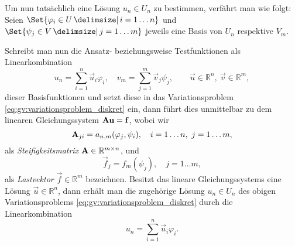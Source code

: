 Um nun tatsächlich eine Lösung $u_{n} \in U_{n}$ zu bestimmen, verfährt man wie folgt:
Seien $\Set{ \varphi_{i} \in U \given i = 1 \dots n }$ und $\Set{ \psi_{j} \in V \given j = 1 \dots m}$ jeweils eine Basis von $U_{n}$ respektive $V_{m}$.

Schreibt man nun die Ansatz- beziehungsweise Testfunktionen als Linearkombination
\begin{equation}
    u_{n} = \sum_{i = 1}^{n} \vec{u}_{i} \varphi_{i}, \quad v_{m} = \sum_{j = 1}^{m} \vec{v}_{j} \psi_{j}, \qquad \vec u \in \mathbb{R}^{n},~\vec v \in \mathbb{R}^{m},
\end{equation}
dieser Basisfunktionen und setzt diese in das Variationsproblem \eqref{eq:gv:variationsproblem_diskret} ein, dann führt dies unmittelbar zu dem linearen Gleichungssystem $\mathbf{A} \mathbf{u} = \mathbf{f}$, wobei wir
\begin{equation}
    \mathbf{A}_{ji} = a_{n, m}(\varphi_{j}, \psi_{i}), \quad i = 1 \dots n,~j = 1 \dots m,
\end{equation}
als \emph{Steifigkeitsmatrix} $\mathbf{A} \in \mathbb{R}^{m \times n}$, und
\begin{equation}
    \vec f_{j} = f_{m}(\psi_{j}), \quad j = 1 \dots m,
\end{equation}
als \emph{Lastvektor} $\vec f \in \mathbb{R}^{m}$ bezeichnen.
Besitzt das lineare Gleichungssystems eine Lösung $\vec u \in \mathbb{R}^{n}$, dann erhält man die zugehörige Lösung $u_{n} \in U_{n}$ des obigen Variationsproblems \eqref{eq:gv:variationsproblem_diskret} durch die Linearkombination
\begin{equation}
    u_{n} = \sum_{i = 1}^{n} \vec{u}_{i} \varphi_{i}.
\end{equation}



